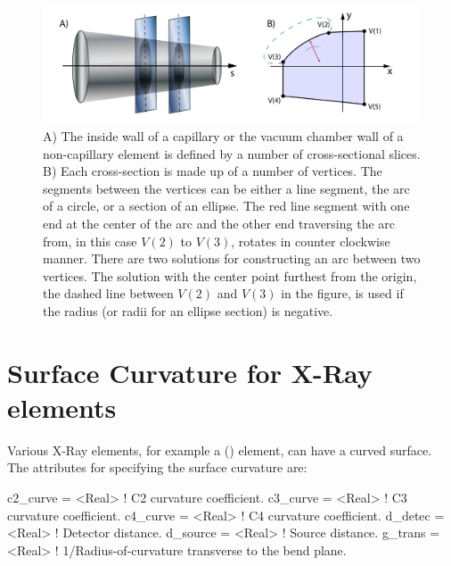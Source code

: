 
\begin{figure}[tb]
  \centering
  \includegraphics[width=6in]{chamber-wall.pdf}
  \caption[cross-sectional slices of a capillary.]
{A) The inside wall of a capillary or the vacuum chamber wall of a
non-capillary element is defined by a number of cross-sectional
slices.  B) Each cross-section is made up of a number of vertices. The
segments between the vertices can be either a line segment, the arc of
a circle, or a section of an ellipse. The red line segment with one
end at the center of the arc and the other end traversing the arc
from, in this case $V(2)$ to $V(3)$, rotates in counter clockwise
manner. There are two solutions for constructing an arc between two
vertices. The solution with the center point furthest from the origin,
the dashed line between $V(2)$ and $V(3)$ in the figure, is used if
the radius (or radii for an ellipse section) is negative.}
  \label{f:chamber.wall}
\end{figure}

\section{Surface Curvature for X-Ray elements}
\label{s:s.curve}

Various X-Ray elements, for example a  ()
element, can have a curved surface. The attributes for specifying the surface curvature are:
\begin{example}
  c2_curve               = <Real>    ! C2 curvature coefficient.
  c3_curve               = <Real>    ! C3 curvature coefficient.
  c4_curve               = <Real>    ! C4 curvature coefficient.
  d_detec                = <Real>    ! Detector distance.
  d_source               = <Real>    ! Source distance.
  g_trans                = <Real>    ! 1/Radius-of-curvature transverse to the bend plane.
\end{example}

